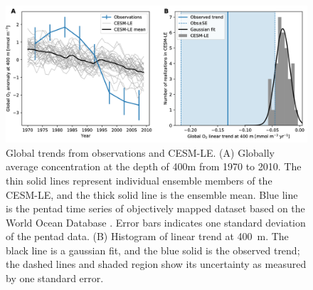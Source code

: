 \documentclass{report_chapter}
\begin{document}
\begin{figure}[tbp]
\centering
\includegraphics[width=1\textwidth]{obs-cesm-global-trends.png}
\caption{Global \OO{} trends from observations and CESM-LE.
(A) Globally average \OO{} concentration at the depth of 400m from 1970 to 2010.
The thin solid lines represent individual ensemble members of the CESM-LE, and the thick solid line is the ensemble mean.
Blue line is the pentad time series of objectively mapped \OO{} dataset based on the World Ocean Database \citep{Ito-Minobe-etal-2017}.
Error bars indicates one standard deviation of the pentad data.
(B) Histogram of linear \OO{} trend at 400~m.
The black line is a gaussian fit, and the blue solid is the observed trend; the dashed lines and shaded region show its uncertainty as measured by one standard error. }
\label{fig:test_trend_global}
\end{figure}
\end{document}

